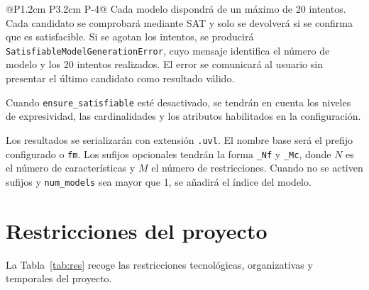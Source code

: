 \begin{longtable}{@{}P{1.2cm} P{3.2cm}
P{\dimexpr\textwidth-4.4cm-4\tabcolsep\relax}@{}}
Cada modelo dispondrá de un máximo de 20 intentos. Cada candidato se
comprobará mediante SAT y solo se devolverá si se confirma que es
satisfacible. Si se agotan los intentos, se producirá
\texttt{SatisfiableModelGenerationError}, cuyo mensaje identifica el
número de modelo y los 20 intentos realizados. El error se comunicará
al usuario sin presentar el último candidato como resultado válido.

Cuando \texttt{ensure\_satisfiable} esté desactivado, se tendrán en
cuenta los niveles de expresividad, las cardinalidades y los atributos
habilitados en la configuración.

Los resultados se serializarán con extensión \texttt{.uvl}. El nombre
base será el prefijo configurado o \texttt{fm}. Los sufijos opcionales
tendrán la forma \texttt{\_Nf} y \texttt{\_Mc}, donde $N$ es el número
de características y $M$ el número de restricciones. Cuando no se
activen sufijos y \texttt{num\_models} sea mayor que 1, se añadirá el
índice del modelo.
\\

\bottomrule
\caption{Reglas de negocio del dominio.}
\label{tab:reglas-negocio}
\end{longtable}

\section{Restricciones del proyecto}
\label{sec:restricciones}

La Tabla~\ref{tab:res} recoge las restricciones tecnológicas, organizativas y temporales del proyecto.

